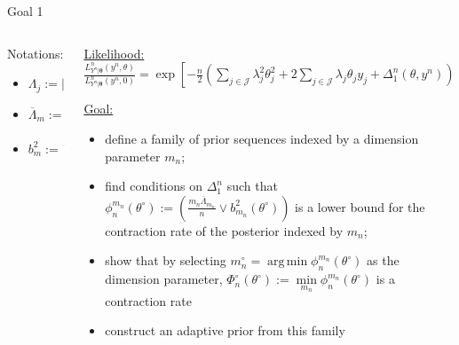 \documentclass[10pt]{beamer}
\DeclareMathOperator*{\argmin}{arg\,min}
\begin{document}
\begin{frame}{Goal 1}
\begin{columns}
\begin{column}[T]{.3\textwidth}%
\bigskip
\bigskip
\begin{block}{Notations:}
\begin{itemize}
\setlength\itemsep{2em}
\item $\Lambda_{j}:= \vert\lambda_{j}\vert^{-2}$
\item $\overline{\Lambda}_{m}:= \frac{1}{m} \sum_{\vert j \vert = 1}^{m} \Lambda_{j}$
\item $b_{m}^{2}:= \sum\limits_{\vert j\vert > m} \vert \theta^{\circ}_{j} \vert^{2}$
\end{itemize}
\end{block}

\end{column}
\begin{column}[T]{.8\textwidth}%
\vfill
\underline{Likelihood:} $\frac{L_{Y^{n} \vert \boldsymbol{\theta}}^{n}(y^{n}, \theta)}{L_{Y^{n} \vert \boldsymbol{\theta}}^{n}(y^{n}, 0)} = \exp\left[-\frac{n}{2}\left(\sum\limits_{j \in \mathcal{J}} \lambda_{j}^{2}\theta_{j}^{2} + 2 \sum\limits_{j \in \mathcal{J}}\lambda_{j} \theta_{j} y_{j} + \Delta_{1}^{n}(\theta, y^{n})\right)\right]$

\bigskip
\bigskip

\underline{Goal:}
\begin{itemize}
\item define a family of prior sequences indexed by a dimension parameter $m_{n}$;
\item find conditions on $\Delta_{1}^{n}$ such that $\phi_{n}^{m_{n}}(\theta^{\circ}):= \left(\frac{m_{n} \overline{\Lambda}_{m_{n}}}{n} \vee b_{m_{n}}^{2}(\theta^{\circ})\right)$ is a lower bound for the contraction rate of the posterior indexed by $m_{n}$;
\item show that by selecting $m_{n}^{\circ} = \argmin \phi_{n}^{m_{n}}(\theta^{\circ})$ as the dimension parameter, $\Phi_{n}^{\circ}(\theta^{\circ}):= \min\limits_{m_{n}} \phi_{n}^{m_{n}}(\theta^{\circ})$ is a contraction rate
\item construct an adaptive prior from this family
\end{itemize}

%
\vfill
\end{column}
\end{columns}
\end{frame}
\end{document}
